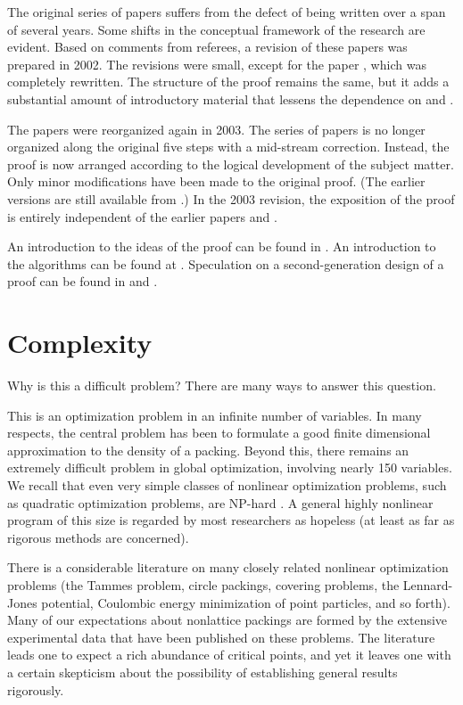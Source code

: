 The original series of papers suffers from the defect of being
written over a span of several years.  Some shifts in the
conceptual framework of the research are evident.   Based on
comments from referees, a revision of these papers was prepared in
2002. The revisions were small, except for the paper
\cite{Hal98D}, which was completely rewritten. The structure of
the proof remains the same, but it adds a substantial amount of
introductory material that lessens the dependence on \cite{part1}
and \cite{part2}.

The papers were reorganized again in 2003.  The series of papers
is no longer organized along the original five steps with a
mid-stream correction.  Instead, the proof is now arranged
according to the logical development of the subject matter.  Only
minor modifications have been made to the original proof.  (The
earlier versions are still available from \cite{arXiv}.)  In the
2003 revision, the exposition of the proof is entirely independent
of the earlier papers \cite{part1} and \cite{part2}.

An introduction to the ideas of the proof can be found in
\cite{CH}. An introduction to the algorithms can be found at
\cite{algorithm}. Speculation on a second-generation design of a
proof can be found in \cite{algorithm} and \cite{arbeitstagung}.


\section{Complexity}

Why is this a difficult problem?  There are many ways to answer this
question.

This is an optimization problem in an infinite number of
variables.  In many respects, the central problem has been to
formulate a good finite dimensional approximation to the density
of a packing.  Beyond this, there remains an extremely difficult
problem in global optimization, involving nearly 150 variables.
We recall that even very simple classes of nonlinear optimization
problems, such as quadratic optimization problems, are NP-hard
\cite{HoPT95}.  A general highly nonlinear program of this size is
regarded by most researchers as hopeless (at least as far as
rigorous methods are concerned).

There is a considerable literature on many closely related nonlinear
optimization problems (the Tammes problem, circle packings, covering
problems, the Lennard-Jones potential, Coulombic energy minimization
of point particles, and so forth). Many of our expectations about
nonlattice packings are formed by the extensive experimental data
that have been published on these problems. The literature leads one
to expect a rich abundance of critical points, and yet it leaves one
with a certain skepticism about the possibility of establishing
general results rigorously.

